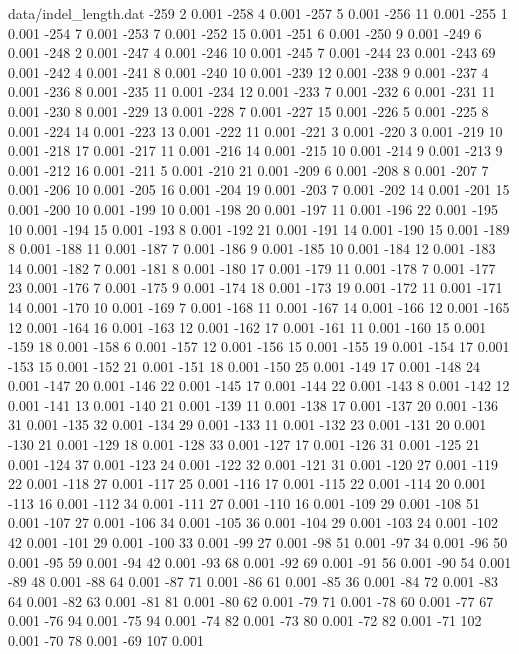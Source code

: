 \begin{filecontents}{data/indel_length.dat}
-259	2	0.001
-258	4	0.001
-257	5	0.001
-256	11	0.001
-255	1	0.001
-254	7	0.001
-253	7	0.001
-252	15	0.001
-251	6	0.001
-250	9	0.001
-249	6	0.001
-248	2	0.001
-247	4	0.001
-246	10	0.001
-245	7	0.001
-244	23	0.001
-243	69	0.001
-242	4	0.001
-241	8	0.001
-240	10	0.001
-239	12	0.001
-238	9	0.001
-237	4	0.001
-236	8	0.001
-235	11	0.001
-234	12	0.001
-233	7	0.001
-232	6	0.001
-231	11	0.001
-230	8	0.001
-229	13	0.001
-228	7	0.001
-227	15	0.001
-226	5	0.001
-225	8	0.001
-224	14	0.001
-223	13	0.001
-222	11	0.001
-221	3	0.001
-220	3	0.001
-219	10	0.001
-218	17	0.001
-217	11	0.001
-216	14	0.001
-215	10	0.001
-214	9	0.001
-213	9	0.001
-212	16	0.001
-211	5	0.001
-210	21	0.001
-209	6	0.001
-208	8	0.001
-207	7	0.001
-206	10	0.001
-205	16	0.001
-204	19	0.001
-203	7	0.001
-202	14	0.001
-201	15	0.001
-200	10	0.001
-199	10	0.001
-198	20	0.001
-197	11	0.001
-196	22	0.001
-195	10	0.001
-194	15	0.001
-193	8	0.001
-192	21	0.001
-191	14	0.001
-190	15	0.001
-189	8	0.001
-188	11	0.001
-187	7	0.001
-186	9	0.001
-185	10	0.001
-184	12	0.001
-183	14	0.001
-182	7	0.001
-181	8	0.001
-180	17	0.001
-179	11	0.001
-178	7	0.001
-177	23	0.001
-176	7	0.001
-175	9	0.001
-174	18	0.001
-173	19	0.001
-172	11	0.001
-171	14	0.001
-170	10	0.001
-169	7	0.001
-168	11	0.001
-167	14	0.001
-166	12	0.001
-165	12	0.001
-164	16	0.001
-163	12	0.001
-162	17	0.001
-161	11	0.001
-160	15	0.001
-159	18	0.001
-158	6	0.001
-157	12	0.001
-156	15	0.001
-155	19	0.001
-154	17	0.001
-153	15	0.001
-152	21	0.001
-151	18	0.001
-150	25	0.001
-149	17	0.001
-148	24	0.001
-147	20	0.001
-146	22	0.001
-145	17	0.001
-144	22	0.001
-143	8	0.001
-142	12	0.001
-141	13	0.001
-140	21	0.001
-139	11	0.001
-138	17	0.001
-137	20	0.001
-136	31	0.001
-135	32	0.001
-134	29	0.001
-133	11	0.001
-132	23	0.001
-131	20	0.001
-130	21	0.001
-129	18	0.001
-128	33	0.001
-127	17	0.001
-126	31	0.001
-125	21	0.001
-124	37	0.001
-123	24	0.001
-122	32	0.001
-121	31	0.001
-120	27	0.001
-119	22	0.001
-118	27	0.001
-117	25	0.001
-116	17	0.001
-115	22	0.001
-114	20	0.001
-113	16	0.001
-112	34	0.001
-111	27	0.001
-110	16	0.001
-109	29	0.001
-108	51	0.001
-107	27	0.001
-106	34	0.001
-105	36	0.001
-104	29	0.001
-103	24	0.001
-102	42	0.001
-101	29	0.001
-100	33	0.001
-99	27	0.001
-98	51	0.001
-97	34	0.001
-96	50	0.001
-95	59	0.001
-94	42	0.001
-93	68	0.001
-92	69	0.001
-91	56	0.001
-90	54	0.001
-89	48	0.001
-88	64	0.001
-87	71	0.001
-86	61	0.001
-85	36	0.001
-84	72	0.001
-83	64	0.001
-82	63	0.001
-81	81	0.001
-80	62	0.001
-79	71	0.001
-78	60	0.001
-77	67	0.001
-76	94	0.001
-75	94	0.001
-74	82	0.001
-73	80	0.001
-72	82	0.001
-71	102	0.001
-70	78	0.001
-69	107	0.001

\end{filecontents}
